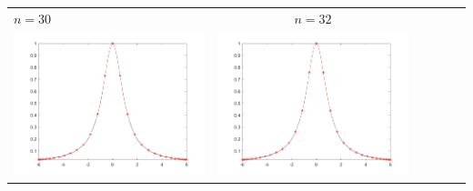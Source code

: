 \small\begin{tabular}{l*{5}{c}}
\hspace{3.5cm}\(n=30\) &  \(n=32\) \\
\includegraphics[scale=0.5]{cap4/4_7/30.png} &  \includegraphics[scale=0.5]{cap4/4_7/32.png} \\


\end{tabular}
